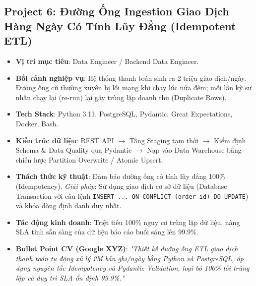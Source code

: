 \subsection{Project 6: Đường Ống Ingestion Giao Dịch Hàng Ngày Có Tính Lũy Đẳng (Idempotent ETL)}
\begin{itemize}
    \item \textbf{Vị trí mục tiêu}: Data Engineer / Backend Data Engineer.
    \item \textbf{Bối cảnh nghiệp vụ}: Hệ thống thanh toán sinh ra 2 triệu giao dịch/ngày. Đường ống cũ thường xuyên bị lỗi mạng khi chạy lúc nửa đêm; mỗi lần kỹ sư nhấn chạy lại (re-run) lại gây trùng lặp doanh thu (Duplicate Rows).
    \item \textbf{Tech Stack}: Python 3.11, PostgreSQL, Pydantic, Great Expectations, Docker, Bash.
    \item \textbf{Kiến trúc dữ liệu}: REST API $\rightarrow$ Tầng Staging tạm thời $\rightarrow$ Kiểm định Schema \& Data Quality qua Pydantic $\rightarrow$ Nạp vào Data Warehouse bằng chiến lược Partition Overwrite / Atomic Upsert.
    \item \textbf{Thách thức kỹ thuật}: Đảm bảo đường ống có tính lũy đẳng 100\% (Idempotency). \textit{Giải pháp}: Sử dụng giao dịch cơ sở dữ liệu (Database Transaction với câu lệnh \texttt{INSERT ... ON CONFLICT (order\_id) DO UPDATE}) và khóa dòng định danh duy nhất.
    \item \textbf{Tác động kinh doanh}: Triệt tiêu 100\% nguy cơ trùng lặp dữ liệu, nâng SLA tính sẵn sàng của dữ liệu báo cáo buổi sáng lên 99.9\%.
    \item \textbf{Bullet Point CV (Google XYZ)}: \textit{"Thiết kế đường ống ETL giao dịch thanh toán tự động xử lý 2M bản ghi/ngày bằng Python và PostgreSQL, áp dụng nguyên tắc Idempotency và Pydantic Validation, loại bỏ 100\% lỗi trùng lặp và duy trì SLA ổn định 99.9\%."}
\end{itemize}

